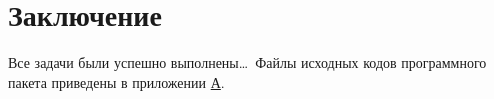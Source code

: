 \documentclass[../main]{subfiles}
\begin{document}
\newpage
{}
{}
\section*{Заключение}

Все задачи были успешно выполнены\dots~Файлы исходных кодов программного пакета приведены в приложении \hyperref[sec:appendix1]{А}.
\end{document}
